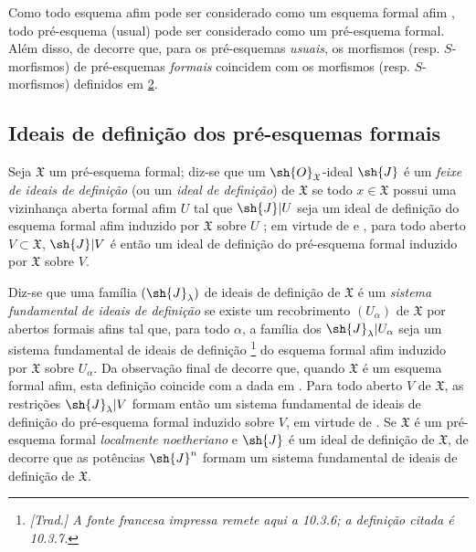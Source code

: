 \documentclass[oneside]{amsart}
\newcommand{\oldpage}[2][]{{\marginnote{\normalfont\textbf{#1}~|~#2}}\ignorespaces}
\let\EGAOriginalLabel\label
\renewcommand{\label}[1]{\phantomsection\EGAOriginalLabel{#1}}
\begin{document}
\begin{env}[10.4.8]
\label{I.10.4.8}
Como todo esquema afim pode ser considerado como um esquema formal afim , todo pré-esquema (usual) pode ser considerado como um pré-esquema formal.
Além disso, de  decorre que, para os pré-esquemas \emph{usuais}, os morfismos (resp. $S$-morfismos) de pré-esquemas \emph{formais} coincidem com os morfismos (resp. $S$-morfismos) definidos em \textsection\hyperref[section:I.2]{2}.
\end{env}

\subsection{Ideais de definição dos pré-esquemas formais}
\label{subsection:I.10.5}

\begin{env}[10.5.1]
\label{I.10.5.1}
Seja $\mathfrak{X}$ um pré-esquema formal; diz-se que um $\sh{O}_\mathfrak{X}$-ideal $\sh{J}$ é um \emph{feixe de ideais de definição} (ou um \emph{ideal de definição}) de $\mathfrak{X}$ se todo $x\in\mathfrak{X}$ possui uma vizinhança aberta formal afim $U$ tal que $\sh{J}|U$ seja um ideal de definição do esquema formal afim induzido por $\mathfrak{X}$ sobre $U$ ; em virtude de  e , para todo aberto $V\subset\mathfrak{X}$, $\sh{J}|V$ é então um ideal de definição do pré-esquema formal induzido por $\mathfrak{X}$ sobre $V$.

Diz-se que uma família $(\sh{J}_\lambda)$ de ideais de definição de $\mathfrak{X}$ é um \emph{sistema fundamental}
\oldpage[I]{187}
\emph{de ideais de definição} se existe um recobrimento $(U_\alpha)$ de $\mathfrak{X}$ por abertos formais afins tal que, para todo $\alpha$, a família dos $\sh{J}_\lambda|U_\alpha$ seja um sistema fundamental de ideais de definição \footnote{\emph{[Trad.] A fonte francesa impressa remete aqui a 10.3.6; a definição citada é 10.3.7.}} do esquema formal afim induzido por $\mathfrak{X}$ sobre $U_\alpha$.
Da observação final de  decorre que, quando $\mathfrak{X}$ é um esquema formal afim, esta definição coincide com a dada em .
Para todo aberto $V$ de $\mathfrak{X}$, as restrições $\sh{J}_\lambda|V$ formam então um sistema fundamental de ideais de definição do pré-esquema formal induzido sobre $V$, em virtude de .
Se $\mathfrak{X}$ é um pré-esquema formal \emph{localmente noetheriano} e $\sh{J}$ é um ideal de definição de $\mathfrak{X}$, de  decorre que as potências $\sh{J}^n$ formam um sistema fundamental de ideais de definição de $\mathfrak{X}$.
\end{env}
\end{document}
